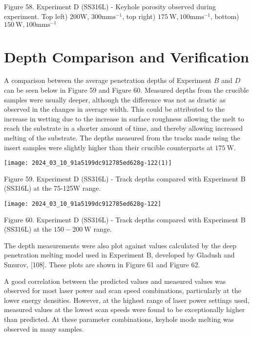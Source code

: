 \documentclass[10pt]{article}
\begin{document}
Figure 58. Experiment D (SS316L) - Keyhole porosity observed during experiment. Top left) 200W, $300 \mathrm{mms}^{-1}$, top right) $175 \mathrm{~W}, 100 \mathrm{mms}^{-1}$, bottom) $150 \mathrm{~W}, 100 \mathrm{mms}^{-1}$

\section*{Depth Comparison and Verification}
A comparison between the average penetration depths of Experiment $B$ and $D$ can be seen below in Figure 59 and Figure 60. Measured depths from the crucible samples were usually deeper, although the difference was not as drastic as observed in the changes in average width. This could be attributed to the increase in wetting due to the increase in surface roughness allowing the melt to reach the substrate in a shorter amount of time, and thereby allowing increased melting of the substrate. The depths measured from the tracks made using the insert samples were slightly higher than their crucible counterparts at $175 \mathrm{~W}$.

\begin{center}
\texttt{[image: 2024\_03\_10\_91a5199dc912785ed628g-122(1)]}
\end{center}

Figure 59. Experiment D (SS316L) - Track depths compared with Experiment B (SS316L) at the 75-125W range.

\begin{center}
\texttt{[image: 2024\_03\_10\_91a5199dc912785ed628g-122]}
\end{center}

Figure 60. Experiment D (SS316L) - Track depths compared with Experiment B (SS316L) at the $150-200 \mathrm{~W}$ range.

The depth measurements were also plot against values calculated by the deep penetration melting model used in Experiment B, developed by Gladush and Smurov, [108]. These plots are shown in Figure 61 and Figure 62.

A good correlation between the predicted values and measured values was observed for most laser power and scan speed combinations, particularly at the lower energy densities. However, at the highest range of laser power settings used, measured values at the lowest scan speeds were found to be exceptionally higher than predicted. At these parameter combinations, keyhole mode melting was observed in many samples.
\end{document}
